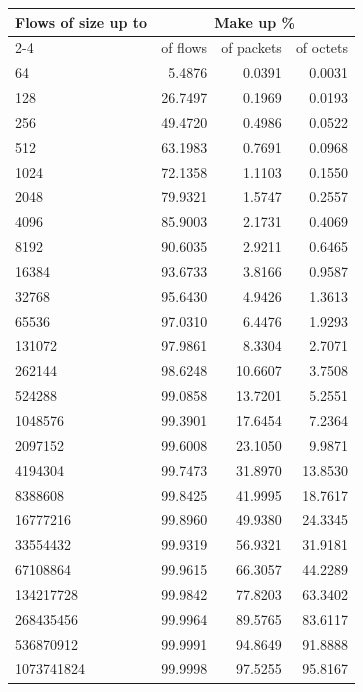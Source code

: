 \begin{tabular}{@{}lrrr@{}}
\toprule
\textbf{Flows of size up to} & \multicolumn{3}{c}{\textbf{Make up \%}} \\
\cmidrule(lr){2-4}
\multicolumn{1}{c}{(bytes)} & of flows & of packets & of octets \\
\midrule
64 & 5.4876 & 0.0391 & 0.0031 \\
128 & 26.7497 & 0.1969 & 0.0193 \\
256 & 49.4720 & 0.4986 & 0.0522 \\
512 & 63.1983 & 0.7691 & 0.0968 \\
1024 & 72.1358 & 1.1103 & 0.1550 \\
2048 & 79.9321 & 1.5747 & 0.2557 \\
4096 & 85.9003 & 2.1731 & 0.4069 \\
8192 & 90.6035 & 2.9211 & 0.6465 \\
16384 & 93.6733 & 3.8166 & 0.9587 \\
32768 & 95.6430 & 4.9426 & 1.3613 \\
65536 & 97.0310 & 6.4476 & 1.9293 \\
131072 & 97.9861 & 8.3304 & 2.7071 \\
262144 & 98.6248 & 10.6607 & 3.7508 \\
524288 & 99.0858 & 13.7201 & 5.2551 \\
1048576 & 99.3901 & 17.6454 & 7.2364 \\
2097152 & 99.6008 & 23.1050 & 9.9871 \\
4194304 & 99.7473 & 31.8970 & 13.8530 \\
8388608 & 99.8425 & 41.9995 & 18.7617 \\
16777216 & 99.8960 & 49.9380 & 24.3345 \\
33554432 & 99.9319 & 56.9321 & 31.9181 \\
67108864 & 99.9615 & 66.3057 & 44.2289 \\
134217728 & 99.9842 & 77.8203 & 63.3402 \\
268435456 & 99.9964 & 89.5765 & 83.6117 \\
536870912 & 99.9991 & 94.8649 & 91.8888 \\
1073741824 & 99.9998 & 97.5255 & 95.8167 \\
\bottomrule
\end{tabular}


